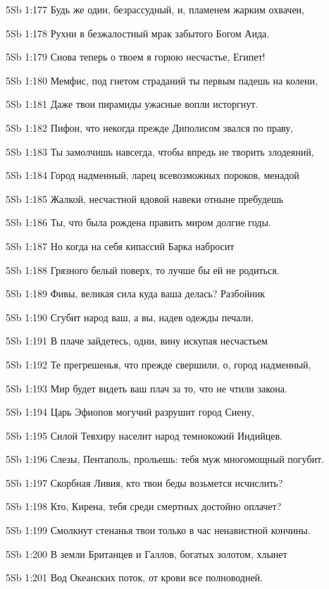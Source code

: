 \vs 5Sb 1:177 Будь же один, безрассудный, и, пламенем жарким охвачен, 

\vs 5Sb 1:178 Рухни в безжалостный мрак забытого Богом Аида.

\vs 5Sb 1:179 Снова теперь о твоем я горюю несчастье, Египет! 

\vs 5Sb 1:180 Мемфис, под гнетом страданий ты первым падешь на колени,

\vs 5Sb 1:181 Даже твои пирамиды ужасные вопли исторгнут.

\vs 5Sb 1:182 Пифон, что некогда прежде Диполисом звался по праву,

\vs 5Sb 1:183 Ты замолчишь навсегда, чтобы впредь не творить злодеяний,

\vs 5Sb 1:184 Город надменный, ларец всевозможных пороков, менадой 

\vs 5Sb 1:185 Жалкой, несчастной вдовой навеки отныне пребудешь 

\vs 5Sb 1:186 Ты, что была рождена править миром долгие годы.

\vs 5Sb 1:187 Но когда на себя кипассий Барка набросит

\vs 5Sb 1:188 Грязного белый поверх, то лучше бы ей не родиться.

\vs 5Sb 1:189 Фивы, великая сила куда ваша делась? Разбойник 

\vs 5Sb 1:190 Сгубит народ ваш, а вы, надев одежды печали,

\vs 5Sb 1:191 В плаче зайдетесь, одни, вину искупая несчастьем 

\vs 5Sb 1:192 Те прегрешенья, что прежде свершили, о, город надменный,

\vs 5Sb 1:193 Мир будет видеть ваш плач  за то, что не чтили закона.

\vs 5Sb 1:194 Царь Эфиопов могучий разрушит город Сиену, 

\vs 5Sb 1:195 Силой Тевхиру населит народ темнокожий Индийцев.

\vs 5Sb 1:196 Слезы, Пентаполь, прольешь: тебя муж многомощный погубит.

\vs 5Sb 1:197 Скорбная Ливия, кто твои беды возьмется исчислить?

\vs 5Sb 1:198 Кто, Кирена, тебя среди смертных достойно оплачет?

\vs 5Sb 1:199 Смолкнут стенанья твои только в час ненавистной кончины.

\vs 5Sb 1:200 В земли Британцев и Галлов, богатых золотом, хлынет 

\vs 5Sb 1:201 Вод Океанских поток, от крови все полноводней. 

